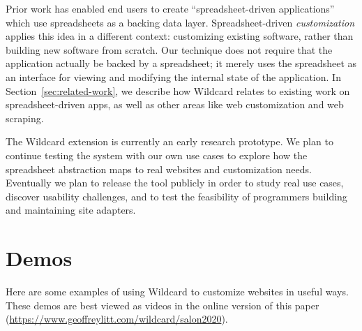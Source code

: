 \documentclass[english,submission]{programming}
\begin{document}
Prior work \autocite{mccutchen2016,benson2014,chang2014} has enabled end
users to create ``spreadsheet-driven applications'' which use
spreadsheets as a backing data layer. Spreadsheet-driven
\emph{customization} applies this idea in a different context:
customizing existing software, rather than building new software from
scratch. Our technique does not require that the application actually be
backed by a spreadsheet; it merely uses the spreadsheet as an interface
for viewing and modifying the internal state of the application. In
Section~\ref{sec:related-work}, we describe how Wildcard relates to
existing work on spreadsheet-driven apps, as well as other areas like
web customization and web scraping.

The Wildcard extension is currently an early research prototype. We plan
to continue testing the system with our own use cases to explore how the
spreadsheet abstraction maps to real websites and customization needs.
Eventually we plan to release the tool publicly in order to study real
use cases, discover usability challenges, and to test the feasibility of
programmers building and maintaining site adapters.

\hypertarget{sec:demos}{%
\section{Demos}\label{sec:demos}}

Here are some examples of using Wildcard to customize websites in useful
ways.{ These demos are best viewed as videos in the online version of
this paper (\url{https://www.geoffreylitt.com/wildcard/salon2020}).}
\end{document}
